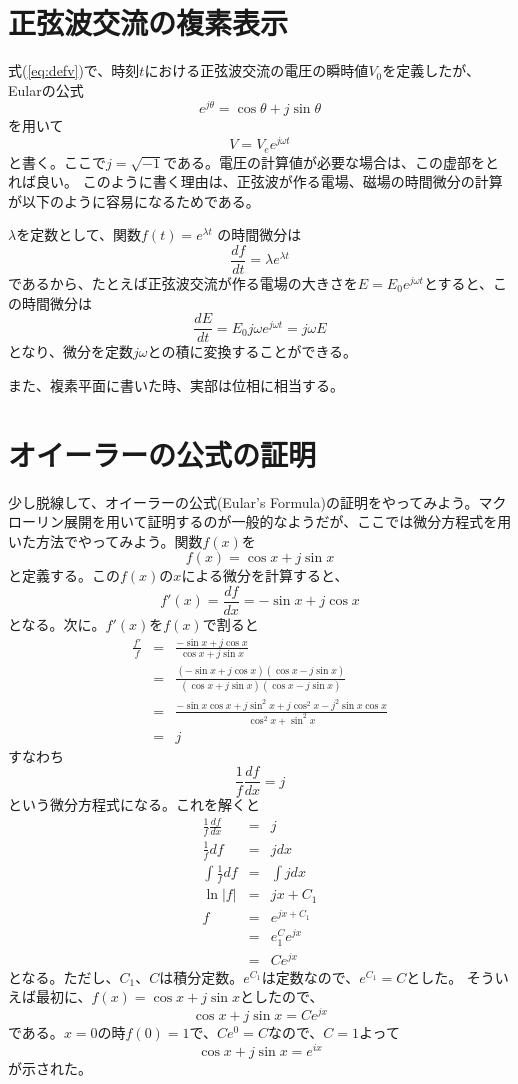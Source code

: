 \section{正弦波交流の複素表示}
式(\ref{eq:defv})で、時刻$t$における正弦波交流の電圧の瞬時値$V_0$を定義したが、
Eularの公式
\[
e^{j\theta} = \cos\theta + j\sin\theta
\]
を用いて
\begin{equation}
V = V_e e^{j\omega t} \label{eq:sinwave}
\end{equation}
と書く。ここで$j=\sqrt{-1}$である。電圧の計算値が必要な場合は、この虚部をとれば良い。
このように書く理由は、正弦波が作る電場、磁場の時間微分の計算が以下のように容易になるためである。

$\lambda$を定数として、関数$f(t)=e^{\lambda t}$
の時間微分は
\[
\frac{df}{dt}=\lambda e^{\lambda t}
\]
であるから、たとえば正弦波交流が作る電場の大きさを$E=E_0e^{j\omega t}$とすると、この時間微分は
\[
\frac{dE}{dt} = E_0 j\omega e^{j \omega t} = j\omega E
\]
となり、微分を定数$j\omega$との積に変換することができる。

また、複素平面に書いた時、実部は位相に相当する。

\section{オイーラーの公式の証明}
少し脱線して、オイーラーの公式(Eular's Formula)の証明をやってみよう。マクローリン展開を用いて証明するのが一般的なようだが、ここでは微分方程式を用いた方法でやってみよう。関数$f(x)$を
\[
f(x) = \cos x + j\sin x
\]
と定義する。この$f(x)$の$x$による微分を計算すると、
\[
f'(x) = \frac{df}{dx} = -\sin x + j\cos x
\]
となる。次に。$f'(x)$を$f(x)$で割ると
\begin{eqnarray*}
\frac{f'}{f} &=& \frac{-\sin x + j\cos x}{\cos x + j\sin x}\\
&=&\frac{(-\sin x + j\cos x)(\cos x - j\sin x)}{(\cos x + j\sin x)(\cos x - j\sin x)}\\
&=&\frac{-\sin x \cos x + j\sin^2 x + j\cos^2 x -j^2\sin x \cos x}{\cos^2 x + \sin^2 x}\\
&=&j
\end{eqnarray*}
すなわち
\[
\frac{1}{f}\frac{df}{dx} = j
\]
という微分方程式になる。これを解くと
\begin{eqnarray*}
\frac{1}{f}\frac{df}{dx} &=& j\\
\frac{1}{f}df &=& jdx\\
\int \frac{1}{f} df &=& \int j dx\\
\ln|f| &=& jx + C_1\\
f &=& e^{jx+C_1}\\
  &=& e^C_1e^{jx}\\
 &=& C e^{jx}
\end{eqnarray*}
となる。ただし、$C_1$、$C$は積分定数。$e^{C_1}$は定数なので、$e^{C_1}=C$とした。
そういえば最初に、$f(x)=\cos x + j\sin x$としたので、
\[
\cos x + j\sin x = C e^{jx}
\]
である。$x=0$の時$f(0) = 1$で、$C e^{0} = C$なので、$C=1$よって
\[
\cos x + j\sin x = e^{ix}
\]
が示された。


